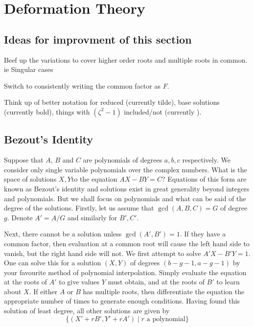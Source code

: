 
\section{Deformation Theory}
\label{sec:Deformation Theory}

\subsection{Ideas for improvment of this section}
\label{sec:Ideas for improvment}
Beef up the variations to cover higher order roots and multiple roots in common. ie Singular cases

Switch to consistently writing the common factor as $F$.

Think up of better notation for reduced (currently tilde), base solutions (currently bold), things with $(ζ^2-1)$ included/not (currently ).






















\subsection{Bezout's Identity}
\label{sub:Bezout's Identity}
Suppose that $A$, $B$ and $C$ are polynomials of degrees $a,b,c$ respectively. We consider only single variable polynomials over the complex numbers. What is the space of solutions $X,Y$to the equation $AX - BY = C$? Equations of this form are known as Bezout's identity and solutions exist in great generality beyond integers and polynomials. But we shall focus on polynomials and what can be said of the degree of the solutions. Firstly, let us assume that $\gcd(A,B,C) = G$ of degree $g$. Denote $A' = A/G$ and similarly for $B',C'$.

Next, there cannot be a solution unless $\gcd(A',B') = 1$. If they have a common factor, then evaluation at a common root will cause the left hand side to vanish, but the right hand side will not. We first attempt to solve $A'X-B'Y = 1$. One can solve this for a solution $(X,Y)$ of degrees $(b-g-1,a-g-1)$ by your favourite method of polynomial interpolation. Simply evaluate the equation at the roots of $A'$ to give values $Y$ must obtain, and at the roots of $B'$ to learn about $X$. If either $A$ or $B$ has multiple roots, then differentiate the equation the appropriate number of times to generate enough conditions. Having found this solution of least degree, all other solutions are given by
\[
\{(X' + rB', Y' + rA') \mid r \text{ a polynomial} \}
\]

